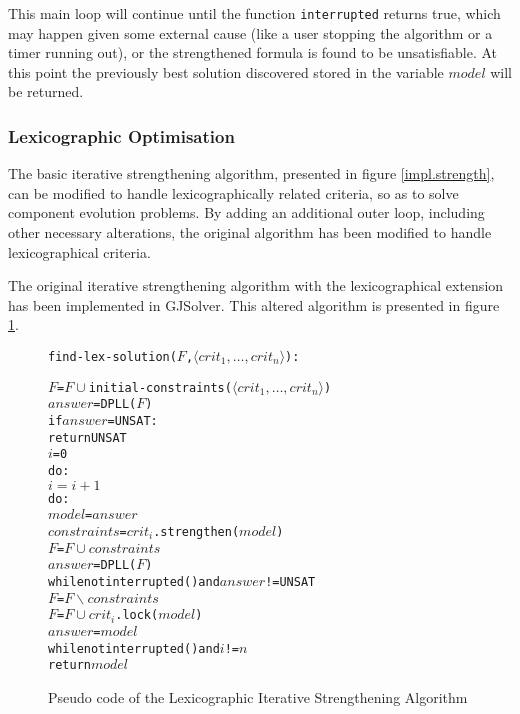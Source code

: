 This main loop will continue until the function \verb+interrupted+ returns true, which may happen given some external cause (like a user stopping the algorithm or a timer running out),
or the strengthened formula is found to be unsatisfiable.
At this point the previously best solution discovered stored in the variable $model$ will be returned.

\subsubsection{Lexicographic Optimisation}
The basic iterative strengthening algorithm, presented in figure \ref{impl.strength}, can be modified to handle lexicographically related criteria, so as to solve component evolution problems.
By adding an additional outer loop, including other necessary alterations, the original algorithm has been modified to handle lexicographical criteria.

The original iterative strengthening algorithm with the lexicographical extension has been implemented in GJSolver. 
This altered algorithm is presented in figure \ref{impl.lexstrength}.

\begin{figure}[htp]
\begin{center}
\begin{alltt}
find-lex-solution(\(F\), \(\langle crit_1, \ldots ,crit_n \rangle \)):
    
    \(F\) = \(F \cup \) initial-constraints(\(\langle crit_1, \ldots ,crit_n \rangle \))
    \(answer\) = DPLL(\(F\))
    if \(answer\) = UNSAT:
        return UNSAT
    \(i\) = 0
    do:
        \(i = i + 1\)
        do:
            \(model\) = \(answer\)
            \(constraints\) = \(crit_i\).strengthen(\(model\))
            \(F\) = \(F \cup constraints\)
            \(answer\) = DPLL(\(F\))
        while not interrupted() and \(answer\) != UNSAT
        \(F\) = \(F \backslash constraints\)
        \(F\) = \(F \cup \) \(crit_i\).lock(\(model\))
        \(answer\) = \(model\)
    while not interrupted() and \(i\) != \(n\)
    return \(model\) 
\end{alltt}
  \caption{Pseudo code of the Lexicographic Iterative Strengthening Algorithm}
  \label{impl.lexstrength}
\end{center}
\end{figure}

